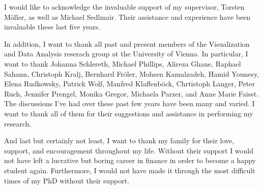 
I would like to acknowledge the invaluable support of my supervisor, Torsten
M{\"o}ller, as well as Michael Sedlmair. Their assistance and experience have
been invaluable these last five years.

In addition, I want to thank all past and present members of the Visualization
and Data Analysis reserach group at the University of Vienna. In particular, I
want to thank Johanna Schlereth, Michael Phillips, Alireza Ghane, Raphael
Sahann, Christoph Kralj, Bernhard Fr{\"o}ler, Mohsen Kamalzadeh, Hamid Younesy,
Elena Rudkowsky, Patrick Wolf, Manfred Klaffenb{\"o}ck, Chrtistoph Langer,
Peter Ruch, Jennifer Prengel, Monika Gregor, Michaela Parzer, and Anne Marie
Faisst. The discussions I've had over these past few years have been many and
varied. I want to thank all of them for their suggestions and assistance in
performing my research.

And last but certainly not least, I want to thank my family for their love,
support, and encouragement throughout my life. Without their support I would
not have left a lucrative but boring career in finance in order to become a
happy student again. Furthermore, I would not have made it through the
most difficult times of my PhD without their support.

